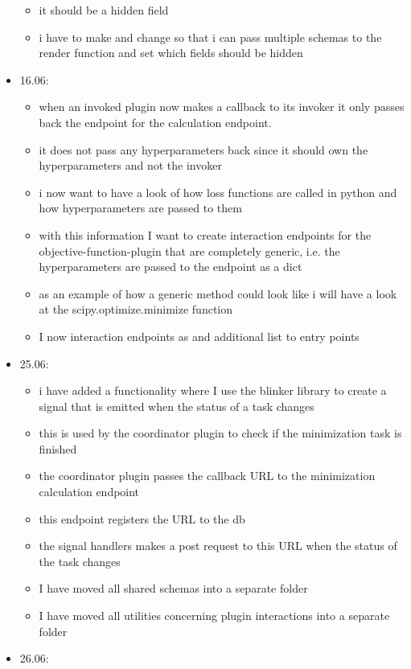 \documentclass[
  a4paper,  %
  twoside,  %
  bibliography=totoc,
  headsepline,
  cleardoublepage=empty,
  parskip=half,
  draft=false
]{scrbook}
\begin{document}
\begin{itemize}
\begin{itemize}
    \item it should be a hidden field
    \item i have to make and change so that i can pass multiple schemas to the render function and set which fields should be hidden
  \end{itemize}
  \item 16.06:
  \begin{itemize}
    \item when an invoked plugin now makes a callback to its invoker it only passes back the endpoint for the calculation endpoint.
    \item it does not pass any hyperparameters back since it should own the hyperparameters and not the invoker
    \item i now want to have a look of how loss functions are called in python and how hyperparameters are passed to them
    \item with this information I want to create interaction endpoints for the objective-function-plugin that are completely generic, i.e. the hyperparameters are passed to the endpoint as a dict
    \item as an example of how a generic method could look like i will have a look at the scipy.optimize.minimize function
    \item I now interaction endpoints as and additional list to entry points
  \end{itemize}
  \item 25.06:
  \begin{itemize}
    \item i have added a functionality where I use the blinker library to create a signal that is emitted when the status of a task changes
    \item this is used by the coordinator plugin to check if the minimization task is finished
    \item the coordinator plugin passes the callback URL to the minimization calculation endpoint
    \item this endpoint registers the URL to the db
    \item the signal handlers makes a post request to this URL when the status of the task changes
    \item I have moved all shared schemas into a separate folder
    \item I have moved all utilities concerning plugin interactions into a separate folder
  \end{itemize}
  \item 26.06:

\end{itemize}
\end{document}
